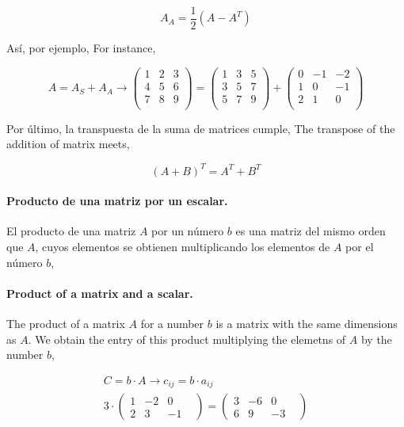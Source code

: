 \begin{equation*}
A_A=\frac{1}{2}\left( A-A^T \right)
\end{equation*}
\begin{paracol}{2}
Así, por ejemplo,
\switchcolumn
For instance,
\end{paracol}
\begin{equation*}
 A=A_S+A_A \rightarrow
\begin{pmatrix}
1& 2& 3\\
4& 5& 6\\
7& 8& 9\\
\end{pmatrix} =
\begin{pmatrix}
1& 3& 5\\
3& 5& 7\\
5& 7& 9\\
\end{pmatrix} +
\begin{pmatrix}
0& -1& -2\\
1& 0& -1\\
2& 1& 0\\
\end{pmatrix}
\end{equation*}
\begin{paracol}{2}
Por último, la transpuesta de la suma de matrices cumple,
\switchcolumn
The transpose of the addition of matrix meets,
\end{paracol}

\begin{equation*}
(A+B)^T=A^T+B^T
\end{equation*}

\begin{paracol}{2}
\paragraph{Producto de una matriz por un escalar.} El producto de una matriz $A$ por un número $b$ es una matriz del mismo orden que $A$, cuyos elementos se obtienen multiplicando los elementos de $A$ por el número $b$,
\switchcolumn
\paragraph{Product of a matrix and a scalar.} The product of a matrix $A$ for a number $b$ is a matrix with the same dimensions as $A$. We obtain the entry of this product multiplying the elemetns of $A$ by the number $b$,
\end{paracol}
\begin{gather*}
C=b\cdot A \rightarrow c_{ij}=b\cdot a_{ij}\\
3\cdot
\begin{pmatrix}
1& -2& 0\\
2& 3& -1&
\end{pmatrix}=
\begin{pmatrix}
3& -6& 0\\
6& 9& -3&
\end{pmatrix} 
\end{gather*}

